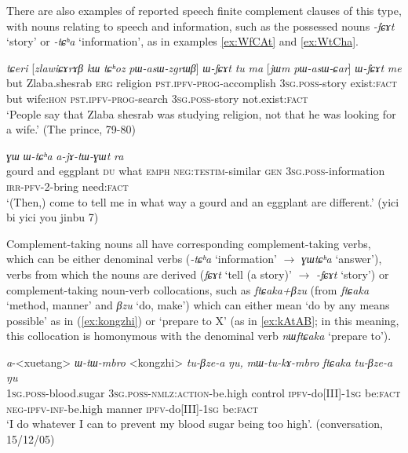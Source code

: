 \documentclass[oneside,a4paper,11pt]{article}
\newcommand{\ipa}[1]{\textit{\phon#1}}
\newcommand{\jpg}[2]{\ipa{#1} `#2'}
\newcommand{\refb}[1]{(\ref{#1})}
\begin{document}
There are also examples of reported speech finite complement clauses of this type, with nouns relating to  speech and information, such as the possessed nouns \jpg{-fɕɤt}{story} or \jpg{-tɕʰa}{information}, as in examples  \ref{ex:WfCAt} and \ref{ex:WtCha}.

\begin{exe}
   \ex  \label{ex:WfCAt}
\gll   \ipa{tɕeri}  	[\ipa{zlawiɕɤrɤβ}  	\ipa{kɯ}  	\ipa{tɕʰoz}  	\ipa{pɯ-asɯ-zgrɯβ}]  	\ipa{ɯ-fɕɤt}  	\ipa{tu}  	\ipa{ma}  	[\ipa{jɯm}  	\ipa{pɯ-asɯ-ɕar}]  	\ipa{ɯ-fɕɤt}  	\ipa{me}  \\
but Zlaba.shesrab \textsc{erg} religion \textsc{pst.ipfv-prog}-accomplish \textsc{3sg.poss}-story
exist:\textsc{fact} but wife:\textsc{hon} \textsc{pst.ipfv-prog}-search \textsc{3sg.poss}-story not.exist:\textsc{fact} \\
\glt `People say that Zlaba shesrab was studying religion, not that he was looking for a wife.'  (The prince, 79-80)
\end{exe}

\begin{exe}
   \ex  \label{ex:WtCha}
\gll   
[<donggua>  	\ipa{cʰo}  	<qiezi>  	\ipa{ni}  	\ipa{tɕʰi}  	\ipa{ʑo}  	\ipa{mɯ́j-natɕɯɣ}]  	\ipa{ɣɯ}  	\ipa{ɯ-tɕʰa}  	\ipa{a-jɤ-tɯ-ɣɯt}  	\ipa{ra}  \\
gourd and eggplant \textsc{du} what \textsc{emph} \textsc{neg:testim}-similar \textsc{gen} \textsc{3sg.poss}-information \textsc{irr-pfv}-2-bring need:\textsc{fact} \\
\glt `(Then,) come to tell me in what way a gourd and an eggplant are different.' (yici bi yici you jinbu 7)
\end{exe}

Complement-taking nouns all have corresponding complement-taking verbs, which can be either denominal verbs (\jpg{-tɕʰa}{information} $\rightarrow$ \jpg{ɣɯtɕʰa}{answer}), verbs from which the nouns are derived (\jpg{fɕɤt}{tell (a story)} $\rightarrow$ \jpg{-fɕɤt}{story}) or complement-taking noun-verb collocations, such as  \ipa{ftɕaka+βzu} (from \jpg{ftɕaka}{method, manner} and  \jpg{βzu}{do, make}) which can either mean  `do by any means possible' as in \refb{ex:kongzhi} or `prepare to X' (as in \ref{ex:kAtAB}; in this meaning, this collocation is homonymous with the denominal verb \jpg{nɯftɕaka}{prepare to}).

 \begin{exe}
\ex \label{ex:kongzhi}
\gll \ipa{a}-<xuetang> 	\ipa{ɯ-tɯ-mbro} 	<kongzhi>	\ipa{tu-βze-a} 	\ipa{ŋu,}  \ipa{mɯ-tu-kɤ-mbro} 	\ipa{ftɕaka} 	\ipa{tu-βze-a} 	\ipa{ŋu} \\
\textsc{1sg.poss}-blood.sugar \textsc{3sg.poss-nmlz:action}-be.high control \textsc{ipfv}-do[III]-\textsc{1sg} be:\textsc{fact} \textsc{neg-ipfv-inf}-be.high manner \textsc{ipfv}-do[III]-\textsc{1sg} be:\textsc{fact} \\
\glt `I do whatever I can to prevent my blood sugar being too high'. (conversation, 15/12/05)
\end{exe}
\end{document}

